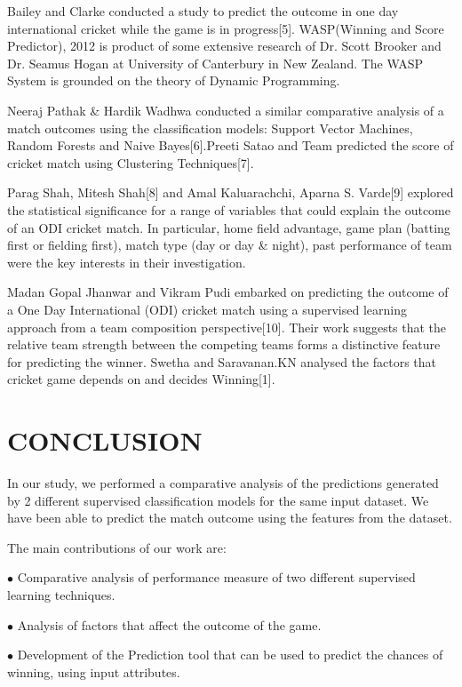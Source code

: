 \documentclass[a4paper, 10pt, conference]{IEEEtran}
\begin{document}
Bailey and Clarke conducted a study to predict the outcome in one day international cricket while the game is in progress[5]. WASP(Winning and Score Predictor), 2012 is product of some extensive research of Dr. Scott Brooker and Dr. Seamus Hogan at University of Canterbury in New Zealand. The WASP System is grounded on the theory of Dynamic Programming.

Neeraj Pathak \& Hardik Wadhwa conducted a similar comparative analysis of a match outcomes using the classification models: Support Vector Machines, Random Forests and Naive Bayes[6].Preeti Satao and Team predicted the score of cricket match using Clustering Techniques[7].

Parag Shah, Mitesh Shah[8] and Amal Kaluarachchi, Aparna S. Varde[9] explored the statistical significance for a range of variables that could explain the outcome of an ODI cricket match. In particular, home field advantage, game plan (batting first or fielding first), match type (day or day \& night), past performance of team were the key interests in their investigation.

Madan Gopal Jhanwar and Vikram Pudi embarked on predicting the outcome of a One Day International (ODI) cricket match using a supervised learning approach from a team composition perspective[10]. Their work suggests that the relative team strength between the competing teams forms a distinctive feature for predicting the winner. Swetha and Saravanan.KN analysed the  factors that cricket game depends on and decides Winning[1]. 


\section{CONCLUSION}

In our study, we performed a comparative analysis of the predictions generated by 2 different supervised classification models for the same input dataset. We have been able to predict the match outcome using the features from the dataset. 

The main contributions of our work are:
\begin{description}
  \item$\bullet$ Comparative analysis of performance measure of two different supervised learning techniques. 
  \item$\bullet$ Analysis of factors that affect the outcome of the game.
  \item$\bullet$ Development of the Prediction tool that can be used to predict the chances of winning, using input attributes.
\end{description}
\end{document}
